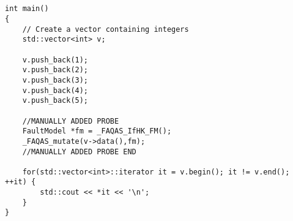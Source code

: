 
\begin{minipage}{15cm}
\begin{lstlisting}[style=CStyle, caption=Example of a data-driven mutation probes., label=probesExample, mathescape=true]


int main()
{
    // Create a vector containing integers
    std::vector<int> v;

    v.push_back(1);
    v.push_back(2);
    v.push_back(3);
    v.push_back(4);
    v.push_back(5);

    //MANUALLY ADDED PROBE
    FaultModel *fm = _FAQAS_IfHK_FM();
    _FAQAS_mutate(v->data(),fm);
    //MANUALLY ADDED PROBE END

    for(std::vector<int>::iterator it = v.begin(); it != v.end(); ++it) {
        std::cout << *it << '\n';
    }
}
\end{lstlisting}
\end{minipage}

